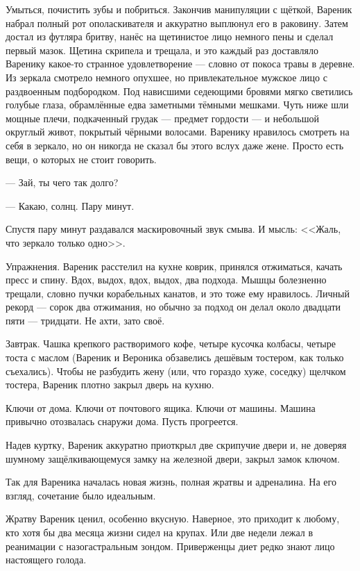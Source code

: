Умыться, почистить зубы и побриться.
Закончив манипуляции с щёткой, Вареник набрал полный рот ополаскивателя и аккуратно выплюнул его в раковину.
Затем достал из футляра бритву, нанёс на щетинистое лицо немного пены и сделал первый мазок.
Щетина скрипела и трещала, и это каждый раз доставляло Варенику какое-то странное удовлетворение --- словно от покоса травы в деревне.
Из зеркала смотрело немного опухшее, но привлекательное мужское лицо с раздвоенным подбородком.
Под нависшими седеющими бровями мягко светились голубые глаза, обрамлённые едва заметными тёмными мешками.
Чуть ниже шли мощные плечи, подкаченный грудак --- предмет гордости --- и небольшой округлый живот, покрытый чёрными волосами.
Варенику нравилось смотреть на себя в зеркало, но он никогда не сказал бы этого вслух даже жене.
Просто есть вещи, о которых не стоит говорить.

--- Зай, ты чего так долго?

--- Какаю, солнц.
Пару минут.

Спустя пару минут раздавался маскировочный звук смыва.
И мысль:
<<Жаль, что зеркало только одно>>.

Упражнения.
Вареник расстелил на кухне коврик, принялся отжиматься, качать пресс и спину.
Вдох, выдох, вдох, выдох, два подхода.
Мышцы болезненно трещали, словно пучки корабельных канатов, и это тоже ему нравилось.
Личный рекорд --- сорок два отжимания, но обычно за подход он делал около двадцати пяти --- тридцати.
Не ахти, зато своё.

Завтрак.
Чашка крепкого растворимого кофе, четыре кусочка колбасы, четыре тоста с маслом (Вареник и Вероника обзавелись дешёвым тостером, как только съехались).
Чтобы не разбудить жену (или, что гораздо хуже, соседку) щелчком тостера, Вареник плотно закрыл дверь на кухню.

Ключи от дома.
Ключи от почтового ящика.
Ключи от машины.
Машина привычно отозвалась снаружи дома.
Пусть прогреется.

Надев куртку, Вареник аккуратно приоткрыл две скрипучие двери и, не доверяя шумному защёлкивающемуся замку на железной двери, закрыл замок ключом.

\asterism

Так для Вареника началась новая жизнь, полная жратвы и адреналина.
На его взгляд, сочетание было идеальным.

Жратву Вареник ценил, особенно вкусную.
Наверное, это приходит к любому, кто хотя бы два месяца жизни сидел на крупах.
Или две недели лежал в реанимации с назогастральным зондом.
Приверженцы диет редко знают лицо настоящего голода.

